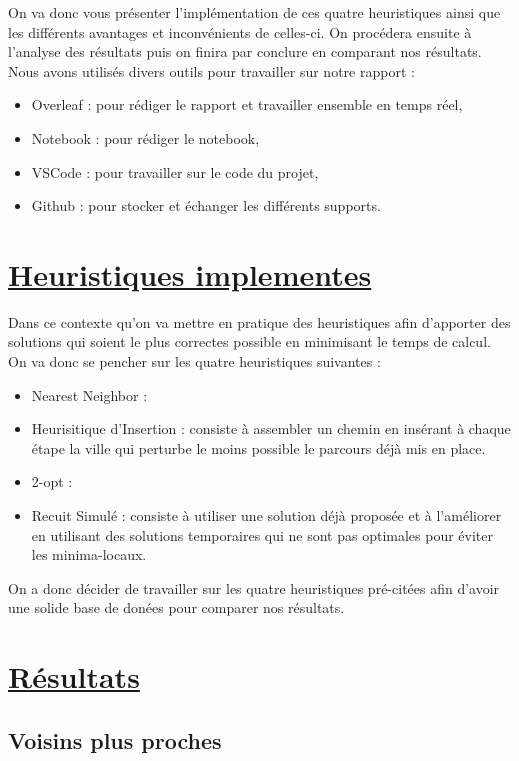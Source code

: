 \documentclass[a4paper,11pt,fleqn]{article}
\begin{document}
On va donc vous présenter l’implémentation de ces quatre heuristiques ainsi que les différents avantages et inconvénients de celles-ci. 
On procédera ensuite à l’analyse des résultats puis on finira par conclure en comparant nos résultats. \\
Nous avons utilisés divers outils pour travailler sur notre rapport :
\begin{itemize}
    \item Overleaf : pour rédiger le rapport et travailler ensemble en temps réel,
    \item Notebook : pour rédiger le notebook,
    \item VSCode : pour travailler sur le code du projet,
    \item Github : pour stocker et échanger les différents supports.
\end{itemize}
\newpage

\section*{\underline{Heuristiques implementes}}
Dans ce contexte qu’on va mettre en pratique des heuristiques afin d’apporter des solutions qui soient le plus correctes possible en minimisant le temps de calcul.
On va donc se pencher sur les quatre heuristiques suivantes :
\begin{itemize}
    \item Nearest Neighbor : 
    \item Heurisitique d’Insertion : consiste à assembler un chemin en insérant à chaque étape la ville qui perturbe le moins possible le parcours déjà mis en place. 
    \item 2-opt :
    \item Recuit Simulé : consiste à utiliser une solution déjà proposée et à l’améliorer en utilisant des solutions temporaires qui ne sont pas optimales pour éviter les minima-locaux. 
\end{itemize}
On a donc décider de travailler sur les quatre heuristiques pré-citées afin d'avoir une solide base de donées pour comparer nos résultats.

\newpage

\section*{\underline{Résultats}}

\subsection*{Voisins plus proches}
\end{document}
